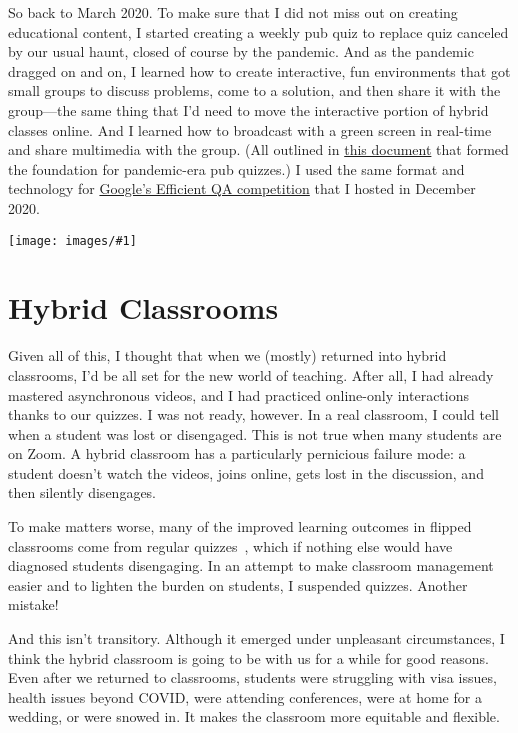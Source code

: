 \documentclass[11pt]{amsart}
\newcommand{\image}[2]{  \begin{center}
\texttt{[image: images/\#1]}
\end{center}
  }
\begin{document}
So back to March 2020. To make sure that I did not miss out on
creating educational content, I started creating a weekly pub quiz to
replace quiz canceled by our usual haunt, closed of course by the
pandemic.  And as the pandemic dragged on and on, I learned how to
create interactive, fun environments that got small groups to discuss
problems, come to a solution, and then share it with the group---the
same thing that I'd need to move the interactive portion of hybrid
classes online.  And I
learned how to broadcast with a green screen in real-time and share
multimedia with the group.  (All outlined in \href{https://docs.google.com/document/d/1YesfpZ_-b2mT3BkTrlOLD5epZxz4uF1DqUkHZHrn344/edit?usp=sharing}{this document} that formed
the foundation for pandemic-era pub quizzes.)  I used the same
format and technology for \href{https://sites.google.com/view/qanta/past-events/neurips-2020-efficient-qa}{Google's Efficient QA competition} that I
hosted in December 2020.

\image{efficient_qa}{}

\section{Hybrid Classrooms}

Given all of this, I thought that when we (mostly) returned into
hybrid classrooms, I'd be all set for the new world of teaching.
After all, I had already mastered asynchronous videos, and I had
practiced online-only interactions thanks to our quizzes.  I was not
ready, however.  In a real classroom, I could tell when a student was
lost or disengaged.  This is not true when many students are on Zoom.
A hybrid classroom has a particularly pernicious failure mode: a
student doesn't watch the videos, joins online, gets lost in the
discussion, and then silently disengages.

To make matters worse, many of the improved learning outcomes in
flipped classrooms come from regular quizzes~\cite{tune-13}, which if
nothing else would have diagnosed students disengaging. In an attempt
to make classroom management easier and to lighten the burden on
students, I suspended quizzes.  Another mistake!

And this isn't transitory.  Although it emerged under unpleasant
circumstances, I think the hybrid classroom is going to be with us for
a while for good reasons.  Even after we returned to classrooms,
students were struggling with visa issues, health issues beyond COVID,
were attending conferences, were at home for a wedding, or were snowed
in.  It makes the classroom more equitable and flexible.
\end{document}
